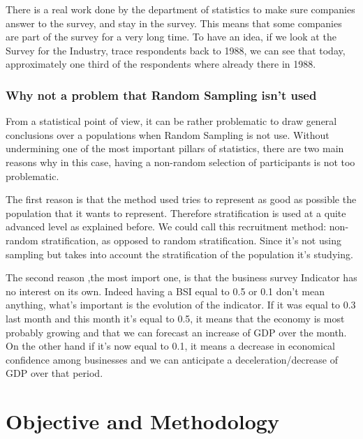 \documentclass[12pt,a4paper,oneside]{book}
\begin{document}
There is a real work done by the department of statistics to make sure companies answer to the survey, and stay in the survey.
This means that some companies are part of the survey for a very long time.
To have an idea, if we look at the Survey for the Industry, trace respondents back to 1988, we can see that today, approximately one third of the respondents where already there in 1988. 

\subsubsection{Why not a problem that Random Sampling isn't used}


From a statistical point of view, it can be rather problematic to draw general conclusions over a populations when Random Sampling is not use.
Without undermining one of the most important pillars of statistics, there are two main reasons why in this case, having a non-random selection of participants is not too problematic.

The first reason is that the method used tries to represent as good as possible the population that it wants to represent. Therefore stratification is used at a quite advanced level as explained before. 
We could call this recruitment method: non-random stratification, as opposed to random stratification. Since it's not using sampling but takes into account the stratification of the population it's studying.

The second reason ,the most import one, is that the business survey Indicator has no interest on its own. Indeed having a BSI equal to 0.5 or 0.1 don't mean anything, what's important is the evolution of the indicator. If it was equal to 0.3 last month and this month it's equal to 0.5, it means that the economy is most probably growing and that we can forecast an increase of GDP over the month. On the other hand if it's now equal to 0.1, it means a decrease in economical confidence among businesses and we can anticipate a deceleration/decrease of GDP over that period.



\section{Objective and Methodology}
\label{section:Objective}
\end{document}
